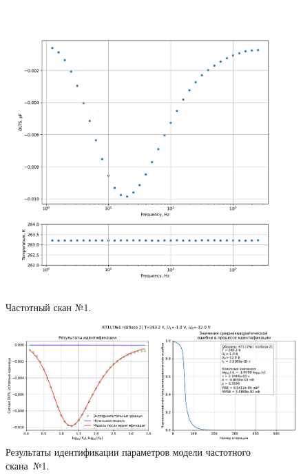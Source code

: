 \begin{figure}[!ht]
    \centering
    \includegraphics[width=1\textwidth]{../plots/КТ117№1_п1(база 2)_2500Гц-1Гц_1пФ_-10С_-1В-12В_200мВ_20мкс_шаг_0,1.pdf}
    \caption{Частотный скан №1.}
    \label{pic:frequency_scan_1}
\end{figure}

\begin{figure}[!ht]
    \centering
    \includegraphics[width=1\textwidth]{../plots/КТ117№1_п1(база 2)_2500Гц-1Гц_1пФ_-10С_-1В-12В_200мВ_20мкс_шаг_0,1_model.pdf}
    \caption{Результаты идентификации параметров модели частотного скана~№1.}
    \label{pic:frequency_scan_model1}
\end{figure}

\pagebreak


